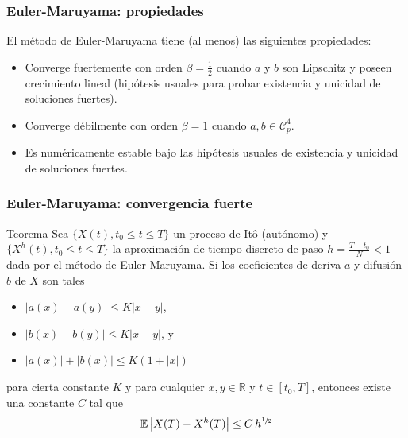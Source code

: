 \documentclass[10pt]{beamer}
\newcommand{\abs}[1]{\ensuremath{\left\lvert #1 \right\rvert}}
\newcommand{\Real}{\mathbb{R}}
\newcommand{\Exp}[1]{\ensuremath{\mathbb{E} #1}}
\begin{document}
\frame
{
    \frametitle{Euler-Maruyama: propiedades}

    El método de Euler-Maruyama tiene (al menos) las siguientes propiedades:

    \begin{itemize}
        \item<2-> Converge fuertemente con orden $\beta = \frac{1}{2}$
        cuando $a$ y $b$ son Lipschitz y poseen crecimiento lineal (hipótesis usuales para
        probar existencia y unicidad de soluciones fuertes).

        \item<3-> Converge débilmente con orden $\beta = 1$ cuando $a, b \in \mathcal{C}^4_p$.

        \item<4-> Es numéricamente estable bajo las hipótesis usuales de existencia y unicidad
        de soluciones fuertes.
    \end{itemize}

}

\frame
{
    \frametitle{Euler-Maruyama: convergencia fuerte}

    \begin{block}{Teorema}
    Sea $\{X(t), t_0 \leq t \leq T\}$ un proceso de Itô (autónomo) y $\{X^h(t), t_0 \leq t \leq T\}$
    la aproximación de tiempo discreto de paso $h = \frac{T-t_0}{N} < 1$ dada por el método de Euler-Maruyama.
    Si los coeficientes de deriva $a$ y difusión $b$ de $X$ son tales
    \begin{itemize}
        \item $\abs{a(x) - a(y)} \leq K \abs{x-y}$,
        \item $\abs{b(x) - b(y)} \leq K \abs{x-y}$, y
        \item $\abs{a(x)} + \abs{b(x)} \leq K (1 + \abs{x})$
    \end{itemize}
    para cierta constante $K$ y para cualquier $x, y \in \Real$ y $t \in [t_0, T]$, entonces
    existe una constante $C$ tal que
    $$\Exp{\abs{X(T) - X^h(T)}} \leq C \, h^{\sfrac{1}{2}}$$
    \end{block}
}
\end{document}
